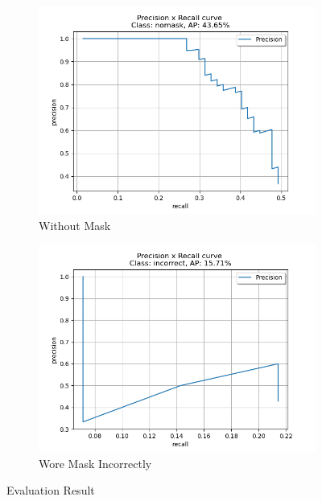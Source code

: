 \documentclass[10pt,a4paper]{report}
\begin{document}
\begin{figure}[hbtp]
\begin{subfigure}[b]{0.8\textwidth}
     \end{subfigure}
     \hfill
     \begin{subfigure}[b]{0.8\textwidth}
         \centering
         \includegraphics[width=\textwidth]{./imgs/nomask.png}
         \caption{Without Mask}
     \end{subfigure}
          \hfill
     \begin{subfigure}[b]{0.8\textwidth}
         \centering
         \includegraphics[width=\textwidth]{./imgs/incorrect.png}
         \caption{Wore Mask Incorrectly}
     \end{subfigure}

        \caption{Evaluation Result}
        \label{fig:e}
\end{figure}
\end{document}
